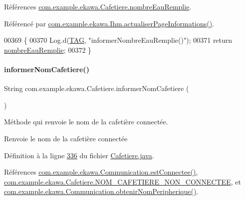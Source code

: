 Références \hyperlink{_cafetiere_8java_source_l00100}{com.\+example.\+ekawa.\+Cafetiere.\+nombre\+Eau\+Remplie}.



Référencé par \hyperlink{_ihm_8java_source_l00919}{com.\+example.\+ekawa.\+Ihm.\+actualiser\+Page\+Informations()}.


\begin{DoxyCode}
00369     \{
00370         Log.d(\hyperlink{classcom_1_1example_1_1ekawa_1_1_cafetiere_aa0c1fd99a2508b06c462aea17034aa91}{TAG}, \textcolor{stringliteral}{"informerNombreEauRemplie()"});
00371         \textcolor{keywordflow}{return} \hyperlink{classcom_1_1example_1_1ekawa_1_1_cafetiere_a2332c2e33acff5084b4571663b48bd89}{nombreEauRemplie};
00372     \}
\end{DoxyCode}
\mbox{\label{classcom_1_1example_1_1ekawa_1_1_cafetiere_aa267545b22527a434e812f8c001d1e8a}} 
\paragraph{\texorpdfstring{informer\+Nom\+Cafetiere()}{informerNomCafetiere()}}
{\footnotesize\ttfamily String com.\+example.\+ekawa.\+Cafetiere.\+informer\+Nom\+Cafetiere (\begin{DoxyParamCaption}{ }\end{DoxyParamCaption})}



Méthode qui renvoie le nom de la cafetière connectée. 

\begin{DoxyReturn}{Renvoie}
le nom de la cafetière connectée 
\end{DoxyReturn}


Définition à la ligne \hyperlink{_cafetiere_8java_source_l00336}{336} du fichier \hyperlink{_cafetiere_8java_source}{Cafetiere.\+java}.



Références \hyperlink{_communication_8java_source_l00260}{com.\+example.\+ekawa.\+Communication.\+est\+Connectee()}, \hyperlink{_cafetiere_8java_source_l00032}{com.\+example.\+ekawa.\+Cafetiere.\+N\+O\+M\+\_\+\+C\+A\+F\+E\+T\+I\+E\+R\+E\+\_\+\+N\+O\+N\+\_\+\+C\+O\+N\+N\+E\+C\+T\+EE}, et \hyperlink{_communication_8java_source_l00379}{com.\+example.\+ekawa.\+Communication.\+obtenir\+Nom\+Peripherique()}.



